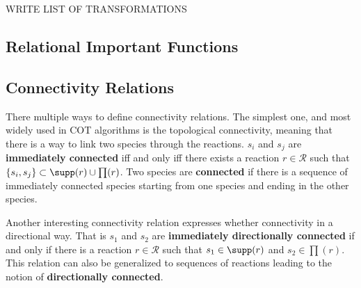 \documentclass[12pt]{article}
\newcommand{\Rs}{\mathcal{R}}
\begin{document}
WRITE LIST OF TRANSFORMATIONS

\subsection{Relational Important Functions}

\subsection{Connectivity Relations}

There multiple ways to define connectivity relations. The simplest one, and most widely used in COT algorithms is the topological connectivity, meaning that there is a way to link two species through the reactions. $s_i$ and $s_j$ are {\bf immediately connected} iff and only iff there exists a reaction $r\in\Rs$ such that $\{s_i,s_j\}\subset\supp(r)\cup\prod(r)$. Two species  are {\bf connected} if there is a sequence of immediately connected species starting from one species and ending in the other species. 

Another interesting connectivity relation expresses whether connectivity in a directional way. 
That is $s_1$ and $s_2$ are {\bf immediately directionally connected} if and only if there is a reaction $r\in\Rs$ such that $s_1\in\supp(r)$ and $s_2\in\prod(r)$. This relation can also be generalized to sequences of reactions leading to the notion of {\bf directionally connected}.



 
\end{document}
